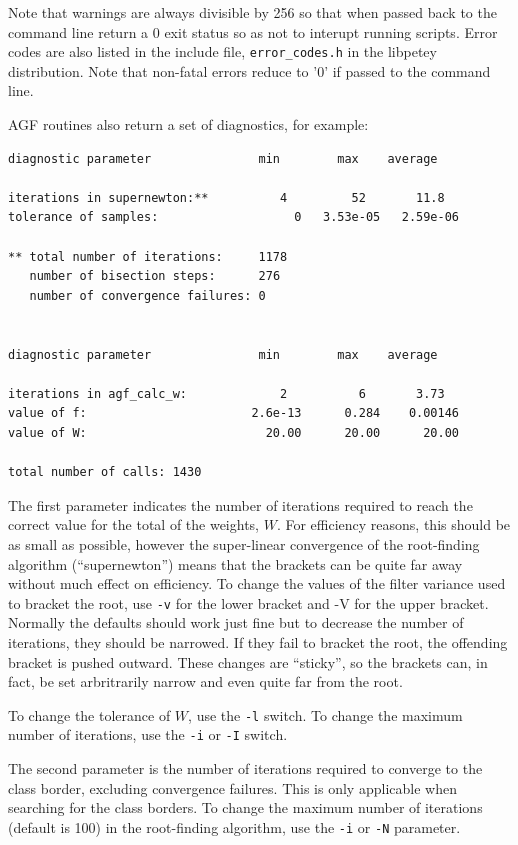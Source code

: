 \documentclass[12pt]{article}
\begin{document}
Note that warnings are always divisible by 256 so that when passed back to the command line return a 0 exit status so as not to interupt running scripts.  Error codes are also listed in the include file, \verb"error_codes.h" in the libpetey distribution.  Note that non-fatal errors reduce to '0' if passed to the command line.

  AGF routines also return a set of diagnostics, for example:

\begin{verbatim}
diagnostic parameter               min        max    average

iterations in supernewton:**          4         52       11.8
tolerance of samples:                   0   3.53e-05   2.59e-06

** total number of iterations:     1178
   number of bisection steps:      276
   number of convergence failures: 0


diagnostic parameter               min        max    average

iterations in agf_calc_w:             2          6       3.73
value of f:                       2.6e-13      0.284    0.00146
value of W:                         20.00      20.00      20.00

total number of calls: 1430

\end{verbatim}

  The first parameter indicates the number of iterations required to reach the correct value for the total of the weights, $W$.  For efficiency reasons, this should be as small as possible, however the super-linear convergence of the root-finding algorithm (``supernewton'') means that the brackets can be quite far away without much effect on efficiency.  To change the values of the filter variance used to bracket the root, use \verb/-v/ for the lower bracket and -V for the upper bracket.  Normally the defaults should work just fine but to decrease the number of iterations, they should be narrowed.  If they fail to bracket the root, the offending bracket is pushed outward.  These changes are ``sticky'', so the brackets can, in fact, be set arbritrarily narrow and even quite far from the root.

  To change the tolerance of $W$, use the \verb/-l/ switch.  To change the maximum number of iterations, use the \verb/-i/ or \verb/-I/ switch.

  The second parameter is the number of iterations required to converge to the class border, excluding convergence failures.  This is only applicable when searching for the class borders.  To change the maximum number of iterations (default is 100) in the root-finding algorithm, use the \verb/-i/ or \verb/-N/ parameter.
\end{document}
